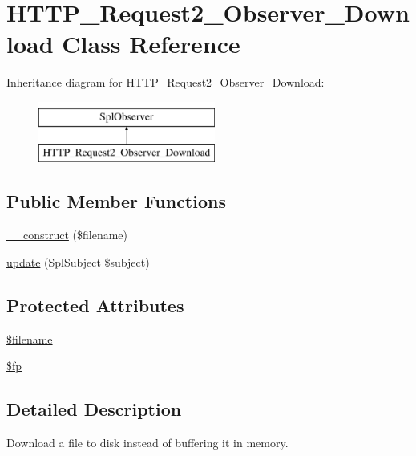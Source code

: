 \hypertarget{classHTTP__Request2__Observer__Download}{}\section{H\+T\+T\+P\+\_\+\+Request2\+\_\+\+Observer\+\_\+\+Download Class Reference}
\label{classHTTP__Request2__Observer__Download}
Inheritance diagram for H\+T\+T\+P\+\_\+\+Request2\+\_\+\+Observer\+\_\+\+Download\+:\begin{figure}[H]
\begin{center}
\leavevmode
\includegraphics[height=2.000000cm]{classHTTP__Request2__Observer__Download}
\end{center}
\end{figure}
\subsection*{Public Member Functions}
\begin{DoxyCompactItemize}
\item 
\hyperlink{classHTTP__Request2__Observer__Download_a67e1f188f88776fa87dc69280ad41ea1}{\+\_\+\+\_\+construct} (\$filename)
\item 
\hyperlink{classHTTP__Request2__Observer__Download_a5be07b74ddd29343e85fed87bef999eb}{update} (Spl\+Subject \$subject)
\end{DoxyCompactItemize}
\subsection*{Protected Attributes}
\begin{DoxyCompactItemize}
\item 
\hyperlink{classHTTP__Request2__Observer__Download_a8d465a7b54376270b909228207640680}{\$filename}
\item 
\hyperlink{classHTTP__Request2__Observer__Download_a25e23c48a242ef021c465dde71719183}{\$fp}
\end{DoxyCompactItemize}


\subsection{Detailed Description}
Download a file to disk instead of buffering it in memory.

